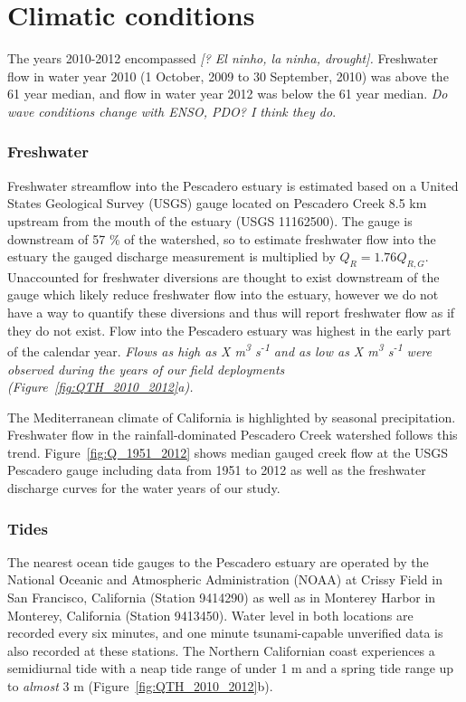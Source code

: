 \section{Climatic conditions} \label{conditions_label}

The years 2010-2012 encompassed \emph{[? El ninho, la ninha, drought].} Freshwater flow in water year 2010 (1 October, 2009 to 30 September, 2010) was above the 61 year median, and flow in water year 2012 was below the 61 year median. \emph{Do wave conditions change with ENSO, PDO? I think they do}.



\subsubsection{Freshwater}
Freshwater streamflow into the Pescadero estuary is estimated based on a United States Geological Survey (USGS) gauge located on Pescadero Creek 8.5 km upstream from the mouth of the estuary (USGS 11162500). The gauge is downstream of 57 \% of the watershed, so to estimate freshwater flow into the estuary the gauged discharge measurement is multiplied by $Q_R = 1.76Q_{R,G}$. Unaccounted for freshwater diversions are thought to exist downstream of
the gauge which likely reduce freshwater flow into the estuary, however we do not have a way to quantify these diversions and thus will report freshwater flow as if they do not exist. Flow into the Pescadero estuary was highest in the early part of the calendar year. \emph{Flows as high as X m\textsuperscript{3} s\textsuperscript{-1} and as low as X m\textsuperscript{3} s\textsuperscript{-1} were observed during the years of our field deployments (Figure~\ref{fig:QTH_2010_2012}a).} 

The Mediterranean climate of California is highlighted by seasonal precipitation. Freshwater flow in the rainfall-dominated Pescadero Creek watershed follows this trend. Figure~\ref{fig:Q_1951_2012} shows median gauged creek flow at the USGS Pescadero gauge including data from 1951 to 2012 as well as the freshwater discharge curves for the water years of our study. 



\subsubsection{Tides}
The nearest ocean tide gauges to the Pescadero estuary are operated by the National Oceanic and Atmospheric Administration (NOAA) at Crissy Field in San Francisco, California (Station 9414290) as well as in Monterey Harbor in Monterey, California (Station 9413450). Water level in both locations are recorded every six minutes, and one minute tsunami-capable unverified data is also recorded at these stations. The Northern Californian coast experiences a semidiurnal tide with a neap tide range of under 1 m and a spring tide range up to \emph{almost} 3 m (Figure~\ref{fig:QTH_2010_2012}b). 


